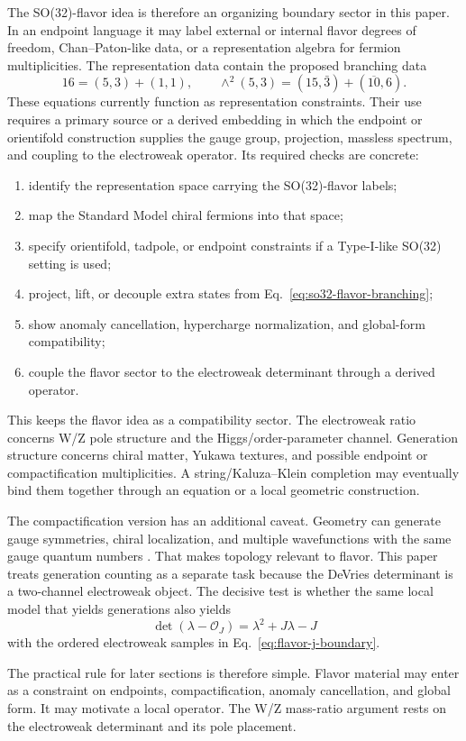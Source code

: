 The SO(32)-flavor idea is therefore an organizing boundary sector in this
paper.  In an endpoint language it may label external or internal flavor
degrees of freedom, Chan--Paton-like data, or a representation algebra for
fermion multiplicities.  The representation data contain the proposed
branching data
\begin{equation}
  16=(5,3)+(1,1),
  \qquad
  \wedge^2(5,3)=(15,\bar 3)+(\overline{10},6).
  \label{eq:so32-flavor-branching}
\end{equation}
These equations currently function as representation constraints.  Their use
requires a primary source or a derived embedding in which the endpoint or
orientifold construction supplies the gauge group, projection, massless
spectrum, and coupling to the electroweak operator.  Its required checks are
concrete:
\begin{enumerate}
\item identify the representation space carrying the SO(32)-flavor labels;
\item map the Standard Model chiral fermions into that space;
\item specify orientifold, tadpole, or endpoint constraints if a Type-I-like SO(32) setting is used;
\item project, lift, or decouple extra states from Eq.~\eqref{eq:so32-flavor-branching};
\item show anomaly cancellation, hypercharge normalization, and global-form compatibility;
\item couple the flavor sector to the electroweak determinant through a derived operator.
\end{enumerate}

This keeps the flavor idea as a compatibility sector.  The electroweak ratio concerns W/Z pole structure and the Higgs/order-parameter channel.  Generation structure concerns chiral matter, Yukawa textures, and possible endpoint or compactification multiplicities.  A string/Kaluza--Klein completion may eventually bind them together through an equation or a local geometric construction.

The compactification version has an additional caveat.  Geometry can generate gauge symmetries, chiral localization, and multiple wavefunctions with the same gauge quantum numbers \cite{WittenKK1981,AcharyaWitten2001,BraunEtAl2019}.  That makes topology relevant to flavor.  This paper treats generation counting as a separate task because the DeVries determinant is a two-channel electroweak object.  The decisive test is whether the same local model that yields generations also yields
\begin{equation}
  \det(\lambda-\mathcal O_J)=\lambda^2+J\lambda-J
  \label{eq:flavor-det-test}
\end{equation}
with the ordered electroweak samples in Eq.~\eqref{eq:flavor-j-boundary}.

The practical rule for later sections is therefore simple.  Flavor material may enter as a constraint on endpoints, compactification, anomaly cancellation, and global form.  It may motivate a local operator.  The W/Z mass-ratio argument rests on the electroweak determinant and its pole placement.
